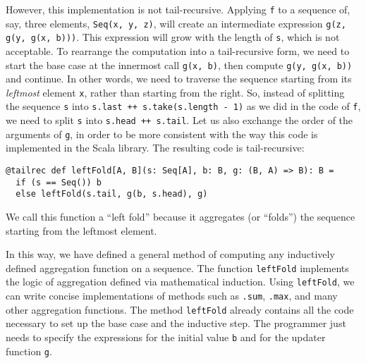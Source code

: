 \noindent However, this implementation is not tail-recursive. Applying
\lstinline!f! to a sequence of, say, three elements, \lstinline!Seq(x, y, z)!,
will create an intermediate expression \lstinline!g(z, g(y, g(x, b)))!.
This expression will grow with the length of \lstinline!s!, which
is not acceptable. To rearrange the computation into a tail-recursive
form, we need to start the base case at the innermost call \lstinline!g(x, b)!,
then compute \lstinline!g(y, g(x, b))! and continue. In other words,
we need to traverse the sequence starting from its \emph{leftmost}
element \lstinline!x!, rather than starting from the right. So, instead
of splitting the sequence \lstinline!s! into \lstinline!s.last ++ s.take(s.length - 1)!
as we did in the code of \lstinline!f!, we need to split \lstinline!s!
into \lstinline!s.head ++ s.tail!. Let us also exchange the order
of the arguments of \lstinline!g!, in order to be more consistent
with the way this code is implemented in the Scala library. The resulting
code is tail-recursive:
\begin{lstlisting}
@tailrec def leftFold[A, B](s: Seq[A], b: B, g: (B, A) => B): B =
  if (s == Seq()) b
  else leftFold(s.tail, g(b, s.head), g)
\end{lstlisting}
We call this function a ``left fold'' because it aggregates (or
``folds'') the sequence starting from the leftmost element.

In this way, we have defined a general method of computing any inductively
defined aggregation function on a sequence. The function \lstinline!leftFold!
implements the logic of aggregation defined via
mathematical induction. Using \lstinline!leftFold!, we can write
concise implementations of methods such as \lstinline!.sum!, \lstinline!.max!,
and many other aggregation functions. The method \lstinline!leftFold!
already contains all the code necessary to set up the base case and
the inductive step. The programmer just needs to specify the expressions
for the initial value \lstinline!b! and for the updater function
\lstinline!g!.

